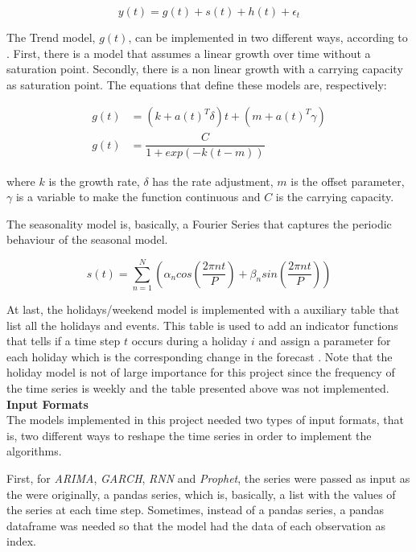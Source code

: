 \documentclass[10pt,twocolumn,letterpaper]{article}
\begin{document}
	\begin{equation}
		y(t)=g(t)+s(t)+h(t)+\epsilon_t
	\end{equation}
	
	The Trend model, $g(t)$, can be implemented in two different ways, according to \cite{taylor2018forecasting}. First, there is a model that assumes a linear growth over time without a saturation point. Secondly, there is a non linear growth with a carrying capacity as saturation point. The equations that define these models are, respectively:
	
	\begin{align}
		g(t)&=(k+a(t)^T\delta)t+(m+a(t)^T\gamma)\\
		g(t)&=\dfrac{C}{1+exp(-k(t-m))}
	\end{align}
	
	where $k$ is the growth rate, $\delta$ has the rate adjustment, $m$ is the offset parameter, $\gamma$ is a variable to make the function continuous and $C$ is the carrying capacity.
	
	The seasonality model is, basically, a Fourier Series that captures the periodic behaviour of the seasonal model.
	
	\begin{equation}
		s(t)=\sum_{n=1}^{N}\left(\alpha_ncos\left(\dfrac{2\pi nt}{P}\right)+\beta_nsin\left(\dfrac{2\pi nt}{P}\right)\right)
	\end{equation} 
	
	
	At last, the holidays/weekend model is implemented with a auxiliary table that list all the holidays and events. This table is used to add an indicator functions that tells if a time step $t$ occurs during a holiday $i$ and assign a parameter for each holiday which is the corresponding change in the forecast \cite{taylor2018forecasting}. Note that the holiday model is not of large importance for this project since the frequency of the time series is weekly and the table presented above was not implemented.\\ 
	
	\textbf{Input Formats}\\
	
	The models implemented in this project needed two types of input formats, that is, two different ways to reshape the time series in order to implement the algorithms.
	
	First, for \textit{ARIMA}, \textit{GARCH}, \textit{RNN} and \textit{Prophet}, the series were passed as input as the were originally, a pandas series, which is, basically, a list with the values of the series at each time step. Sometimes, instead of a pandas series, a pandas dataframe was needed so that the model had the data of each observation as index.
	
\end{document}

